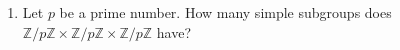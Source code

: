 \documentclass[12pt]{article}
\newcommand{\ZZ}{{\mathbb Z}}
\begin{document}
\begin{enumerate}
\item Let $p$ be a prime number.
  How many simple subgroups does $\ZZ/p\ZZ\times\ZZ/p\ZZ\times \ZZ/p\ZZ$ have?\vspace{-2pt}
  

\end{enumerate}
\end{document}
